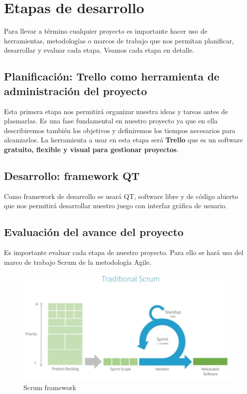 \documentclass{article}
\begin{document}
\section{Etapas de desarrollo} \label{contenido}
Para llevar a término cualquier proyecto es importante hacer uso de herramientas, metodologías o marcos de trabajo que nos permitan planificar, desarrollar y evaluar cada etapa. Veamos cada etapa en detalle\cite{fases_proyectos}.

\subsection{Planificación: Trello como herramienta de administración del proyecto}
Esta primera etapa nos permitirá organizar nuestra ideas y tareas antes de plasmarlas. Es una fase fundamental en nuestro proyecto ya que en ella describiremos también los objetivos y definiremos los tiempos necesarios para alcanzarlos. La herramienta a usar en esta etapa será \textbf{Trello} que es un software \textbf{gratuito, flexible y visual para gestionar proyectos}\cite{trello}.
\\

\subsection{Desarrollo: framework QT}
Como framework de desarrollo se usará QT, software libre y de código abierto que nos permitirá desarrollar nuestro juego con interfaz gráfica de usuario\cite{wiki:xxx}.
\\

\subsection{Evaluación del avance del proyecto}
Es importante evaluar cada etapa de nuestro proyecto. Para ello se hará uso del marco de trabajo Scrum de la metodología Agile\cite{sprint}.
\\
\begin{figure}[h]
\includegraphics[width=12cm]{scrum_img.png}
\centering
\caption{Scrum framework}
\label{fig:scrum_img}
\end{figure}
\end{document}
